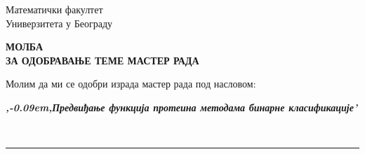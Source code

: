 \documentclass[a4paper]{article}
\def\zn{,\kern-0.09em,}
\begin{document}
\thispagestyle{empty}

\begin{flushleft}
Математички факултет\\
Универзитета у Београду
\end{flushleft}

\bigskip

\begin{center}
\textbf{МОЛБА\\
ЗА ОДОБРАВАЊЕ ТЕМЕ МАСТЕР РАДА
}\end{center}

\bigskip

\begin{flushleft}
Молим да ми се одобри израда мастер рада под насловом:
\end{flushleft}

\begin{minipage}{16.5cm}
\textbf{\textit{\zn Предвиђање функција протеина методама бинарне класификације'}}
\end{minipage}\\
\rule[4mm]{17.5cm}{.05mm}
\end{document}
